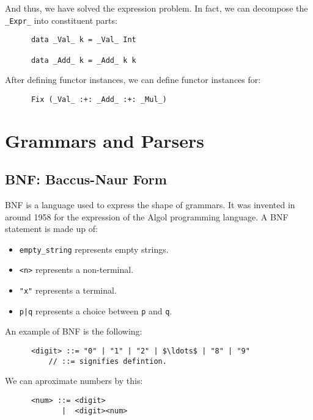 \documentclass[a4paper,12pt]{article}
\theoremstyle{remark}
\begin{document}
  And thus, we have solved the expression problem. In fact, we can decompose the \lstinline{_Expr_}
  into constituent parts:

  \begin{lstlisting}
      data _Val_ k = _Val_ Int

      data _Add_ k = _Add_ k k  \end{lstlisting}

  After defining functor instances, we can define functor instances for:

  \begin{lstlisting}
      Fix (_Val_ :+: _Add_ :+: _Mul_)  \end{lstlisting}

  \section{Grammars and Parsers}

  \subsection{BNF: Baccus-Naur Form}

  BNF is a language used to express the shape of grammars. It was invented in around
  1958 for the expression of the Algol programming language. A BNF statement is made
  up of:

  \begin{itemize}
    \item \lstinline{empty_string} represents empty strings.
    \item \lstinline{<n>} represents a non-terminal.
    \item \lstinline{"x"} represents a terminal.
    \item \lstinline{p|q} represents a choice between \lstinline{p} and \lstinline{q}.
  \end{itemize}

  An example of BNF is the following:

  \begin{lstlisting}
      <digit> ::= "0" | "1" | "2" | $\ldots$ | "8" | "9"
          // ::= signifies defintion.  \end{lstlisting}

  We can aproximate numbers by this:

  \begin{lstlisting}
      <num> ::= <digit>
             |  <digit><num>  \end{lstlisting}
\end{document}
